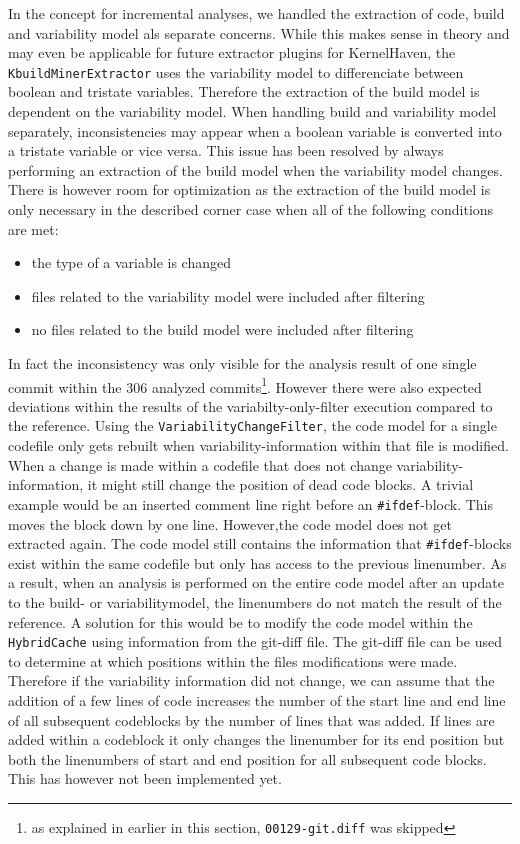 \documentclass[a4paper]{article}
\begin{document}
In the concept for incremental analyses, we handled the extraction of code, build and variability model als separate concerns. While this makes sense in theory and may even be applicable for future extractor plugins for KernelHaven, the \texttt{KbuildMinerExtractor} uses the variability model to differenciate between boolean and tristate variables. Therefore the extraction of the build model is dependent on the variability model. When handling build and variability model separately, inconsistencies may appear when a boolean variable is converted into a tristate variable or vice versa. This issue has been resolved by always performing an extraction of the build model when the variability model changes. There is however room for optimization as the extraction of the build model is only necessary in the described corner case when all of the following conditions are met:

\begin{itemize}
	\item the type of a variable is changed
	\item files related to the variability model were included after filtering
	\item no files related to the build model were included after filtering 
\end{itemize}   

In fact the inconsistency was only visible for the analysis result of one single commit within the 306 analyzed commits\footnote{as explained in earlier in this section, \texttt{00129-git.diff} was skipped}. However there were also expected deviations within the results of the variabilty-only-filter execution compared to the reference. Using the \texttt{Variability\-Change\-Filter}, the code model for a single codefile only gets rebuilt when variability-information within that file is modified. When a change is made within a codefile that does not change variability-information, it might still change the position of dead code blocks. A trivial example would be an inserted comment line right before an \texttt{\#ifdef}-block. This moves the block down by one line. However,the code model does not get extracted again. The code model still contains the information that \texttt{\#ifdef}-blocks exist within the same codefile but only has access to the previous linenumber. As a result, when an analysis is performed on the entire code model after an update to the build- or variabilitymodel, the linenumbers do not match the result of the reference. A solution for this would be to modify the code model within the \texttt{Hybrid\-Cache} using information from the git-diff file. The git-diff file can be used to determine at which positions within the files modifications were made. Therefore if the variability information did not change, we can assume that the addition of a few lines of code increases the number of the start line and end line of all subsequent codeblocks by the number of lines that was added. If lines are added within a codeblock it only changes the linenumber for its end position but both the linenumbers of start and end position for all subsequent code blocks. This has however not been implemented yet.
\end{document}
